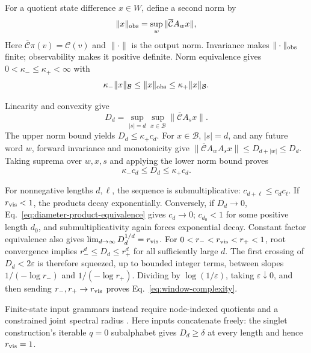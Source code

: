 For a quotient state difference $x\in W$, define a second norm by
\begin{equation}
 \|x\|_{\rm obs}
 =\sup_w\|\overline{\mathcal C}A_wx\|,
 \label{eq:observable-norm}
\end{equation}
Here $\overline{\mathcal C}\pi(v)=\mathcal C(v)$ and $\|\cdot\|$ is the output
norm. Invariance makes $\|\cdot\|_{\rm obs}$ finite; observability makes it
positive definite. Norm equivalence gives $0<\kappa_-\leq\kappa_+<\infty$ with
\begin{equation}
 \kappa_-\|x\|_{\mathcal B}
 \leq\|x\|_{\rm obs}
 \leq\kappa_+\|x\|_{\mathcal B}.
 \label{eq:norm-equivalence}
\end{equation}

Linearity and convexity give
\begin{equation}
 D_d=\sup_{|s|=d}\sup_{x\in\mathcal B}
 \|\overline{\mathcal C}A_sx\|.
 \label{eq:diameter-product}
\end{equation}
The upper norm bound yields $D_d\leq\kappa_+c_d$. For $x\in\mathcal B$,
$|s|=d$, and any future word $w$, forward invariance and monotonicity give
$\|\overline{\mathcal C}A_wA_sx\|\leq D_{d+|w|}\leq D_d$.
Taking suprema over $w,x,s$ and applying the lower norm bound proves
\begin{equation}
 \kappa_-c_d\leq D_d\leq\kappa_+c_d.
 \label{eq:diameter-product-equivalence}
\end{equation}

For nonnegative lengths $d,\ell$, the sequence is submultiplicative:
$c_{d+\ell}\leq c_dc_\ell$. If
$r_{\rm vis}<1$, the products decay exponentially.  Conversely, if
$D_d\to0$, Eq.~\eqref{eq:diameter-product-equivalence} gives $c_d\to0$;
$c_{d_0}<1$ for some positive length $d_0$, and submultiplicativity again
forces exponential decay. Constant
factor equivalence also gives
$\lim_{d\to\infty}D_d^{1/d}=r_{\rm vis}$.  For
$0<r_-<r_{\rm vis}<r_+<1$, root convergence implies
$r_-^d\leq D_d\leq r_+^d$ for all sufficiently large $d$.  The first crossing
of $D_d<2\varepsilon$ is therefore squeezed, up to bounded integer terms,
between slopes $1/(-\log r_-)$ and $1/(-\log r_+)$.  Dividing by
$\log(1/\varepsilon)$, taking $\varepsilon\downarrow0$, and then sending
$r_-,r_+\to r_{\rm vis}$ proves Eq.~\eqref{eq:window-complexity}.

Finite-state input grammars instead require node-indexed quotients and a
constrained joint spectral radius \cite{philippe2016constrained}.
Here inputs concatenate freely: the singlet construction's iterable $q=0$
subalphabet gives $D_d\geq\delta$ at every length and hence $r_{\rm vis}=1$.


